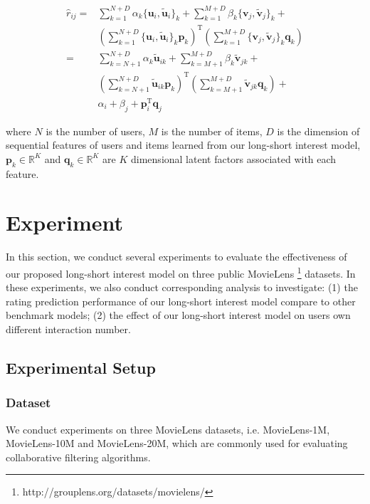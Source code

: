 \documentclass{sig-alternate-05-2015}
\begin{document}
\begin{equation}
\begin{aligned}
\hat{r}_{ij} =
&\sum_{k=1}^{N+D} \alpha_k \{ \mathbf{u}_i , \tilde{\mathbf{u}}_i \}_k +
 \sum_{k=1}^{M+D} \beta_k  \{ \mathbf{v}_j , \tilde{\mathbf{v}}_j \}_k + \\
&\left( \sum_{k=1}^{N+D} \{ \mathbf{u}_i , \tilde{\mathbf{u}}_i \}_k \mathbf{p}_k \right) ^ \mathrm{T}
 \left( \sum_{k=1}^{M+D} \{ \mathbf{v}_j , \tilde{\mathbf{v}}_j \}_k \mathbf{q}_k \right) \\
= &\sum_{k=N+1}^{N+D} \alpha_k \tilde{\mathbf{u}}_{ik} +
 \sum_{k=M+1}^{M+D} \beta_k  \tilde{\mathbf{v}}_{jk} + \\
&\left( \sum_{k=N+1}^{N+D} \tilde{\mathbf{u}}_{ik} \mathbf{p}_k \right) ^ \mathrm{T}
 \left( \sum_{k=M+1}^{M+D} \tilde{\mathbf{v}}_{jk} \mathbf{q}_k \right) + \\
&\alpha_i + \beta_j + \mathbf{p}_i ^ \mathrm{T} \mathbf{q}_j
\end{aligned}
\end{equation}

where $N$ is the number of users, $M$ is the number of items,
$D$ is the dimension of sequential features of users and items learned from
our long-short interest model,
$\mathbf{p}_{k} \in \mathbb{R}^K$ and $\mathbf{q}_{k} \in \mathbb{R}^K$
are $K$ dimensional latent factors associated with each feature.

\section{Experiment}
In this section, we conduct several experiments to evaluate the effectiveness
of our proposed long-short interest model on three public
MovieLens \footnote{http://grouplens.org/datasets/movielens/} datasets.
In these experiments, we also conduct corresponding analysis to investigate:
(1) the rating prediction performance of our long-short interest model
compare to other benchmark models;
(2) the effect of our long-short interest model on users own different interaction number.

\subsection{Experimental Setup}
\subsubsection{Dataset}
We conduct experiments on three MovieLens datasets, i.e. MovieLens-1M,
MovieLens-10M and MovieLens-20M, which are commonly used for evaluating
collaborative filtering algorithms.
\end{document}
